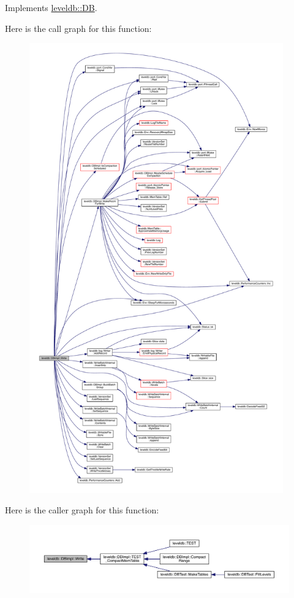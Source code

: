 Implements \hyperlink{classleveldb_1_1_d_b_ae0b6ded8c8e0b88ff70190bf7a0c086c}{leveldb\+::\+D\+B}.



Here is the call graph for this function\+:\nopagebreak
\begin{figure}[H]
\begin{center}
\leavevmode
\includegraphics[height=550pt]{classleveldb_1_1_d_b_impl_ac0d0b472717099d6a02ad9dace4e8ef4_cgraph}
\end{center}
\end{figure}




Here is the caller graph for this function\+:\nopagebreak
\begin{figure}[H]
\begin{center}
\leavevmode
\includegraphics[width=350pt]{classleveldb_1_1_d_b_impl_ac0d0b472717099d6a02ad9dace4e8ef4_icgraph}
\end{center}
\end{figure}


